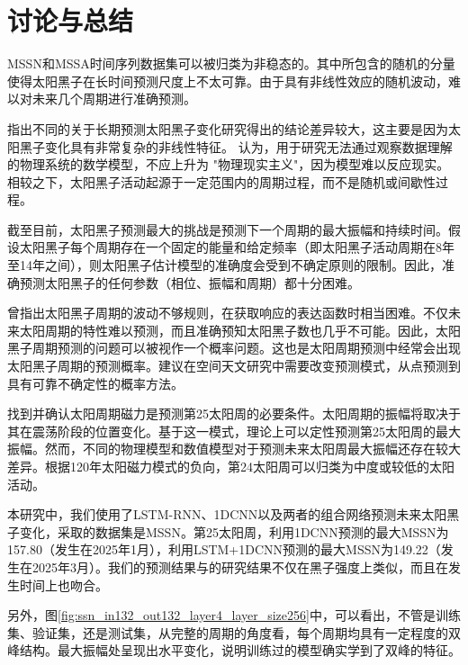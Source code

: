 \section{讨论与总结}\label{sec:ss_conclusion}

MSSN和MSSA时间序列数据集可以被归类为非稳态的。其中所包含的随机的分量使得太阳黑子在长时间预测尺度上不太可靠。由于具有非线性效应的随机波动，难以对未来几个周期进行准确预测\citep{charbonneau2010dynamo,petrovay2010solar}。

\citet{solanki2011analyzing}指出不同的关于长期预测太阳黑子变化研究得出的结论差异较大，这主要是因为太阳黑子变化具有非常复杂的非线性特征。 \citet{charbonneau2010dynamo}认为，用于研究无法通过观察数据理解的物理系统的数学模型，不应上升为 "物理现实主义"，因为模型难以反应现实。相较之下，太阳黑子活动起源于一定范围内的周期过程，而不是随机或间歇性过程\citep{mendoza2011mid}。

截至目前，太阳黑子预测最大的挑战是预测下一个周期的最大振幅和持续时间\citep{petrovay2010solar}。\citet{herrera2015reconstruction}假设太阳黑子每个周期存在一个固定的能量和给定频率（即太阳黑子活动周期在8年至14年之间），则太阳黑子估计模型的准确度会受到不确定原则的限制。因此，准确预测太阳黑子的任何参数（相位、振幅和周期）都十分困难。

\citet{gleissberg1939long}曾指出太阳黑子周期的波动不够规则，在获取响应的表达函数时相当困难。不仅未来太阳周期的特性难以预测，而且准确预知太阳黑子数也几乎不可能。因此，太阳黑子周期预测的问题可以被视作一个概率问题。这也是太阳周期预测中经常会出现太阳黑子周期的预测概率。\citet{camporeale2019challenge}建议在空间天文研究中需要改变预测模式，从点预测到具有可靠不确定性的概率方法。

找到并确认太阳周期磁力是预测第25太阳周的必要条件。太阳周期的振幅将取决于其在震荡阶段的位置变化。基于这一模式，理论上可以定性预测第25太阳周的最大振幅。然而，不同的物理模型和数值模型对于预测未来太阳周最大振幅还存在较大差异。根据120年太阳磁力模式的负向，第24太阳周可以归类为中度或较低的太阳活动。

本研究中，我们使用了LSTM-RNN、1DCNN以及两者的组合网络预测未来太阳黑子变化，采取的数据集是MSSN。第25太阳周，利用1DCNN预测的最大MSSN为157.80（发生在2025年1月），利用LSTM+1DCNN预测的最大MSSN为149.22（发生在2025年3月）。我们的预测结果与\citet{covas2019neural}的研究结果不仅在黑子强度上类似，而且在发生时间上也吻合。

另外，图\ref{fig:ssn_in132_out132_layer4_layer_size256}中，可以看出，不管是训练集、验证集，还是测试集，从完整的周期的角度看，每个周期均具有一定程度的双峰结构。最大振幅处呈现出水平变化，说明训练过的模型确实学到了双峰的特征。

